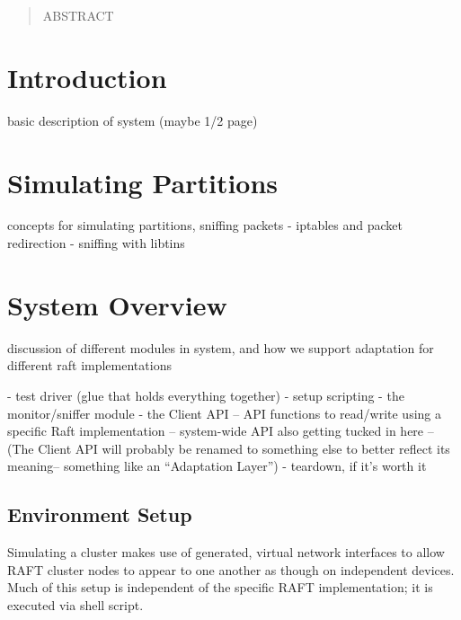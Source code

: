 \documentclass[UTF8]{article}
\begin{document}
 

\setlength\parindent{24pt}

\begin{abstract}
	
ABSTRACT

\end{abstract} 

\section{Introduction}

basic description of system (maybe 1/2 page)

\section{Simulating Partitions}

concepts for simulating partitions, sniffing packets
- iptables and packet redirection
- sniffing with libtins

\section{System Overview}

discussion of different modules in system, and how we support adaptation for different raft implementations

- test driver (glue that holds everything together)
- setup scripting
- the monitor/sniffer module
- the Client API
-- API functions to read/write using a specific Raft implementation
-- system-wide API also getting tucked in here
-- (The Client API will probably be renamed to something else to better reflect its meaning-- something like an ``Adaptation Layer'')
- teardown, if it's worth it

\subsection{Environment Setup}

Simulating a cluster makes use of generated, virtual network interfaces to allow RAFT cluster nodes to appear to one another as though on independent devices. Much of this setup is independent of the specific RAFT implementation; it is executed via shell script.
\end{document}
